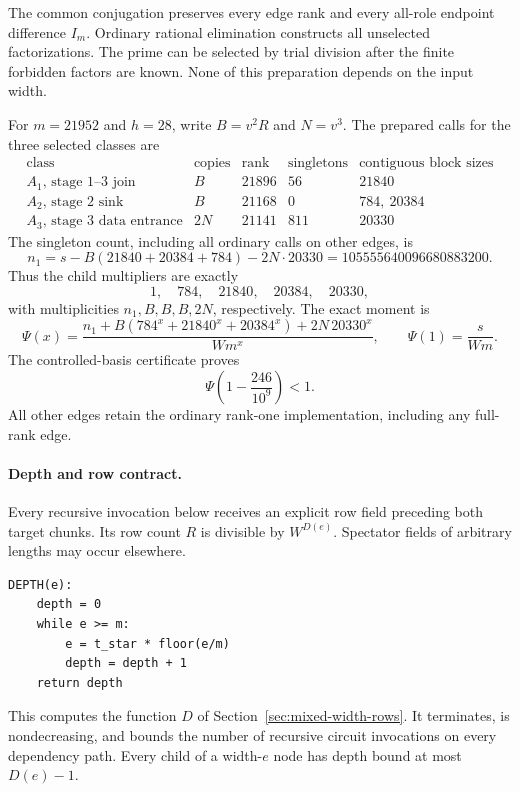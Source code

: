The common conjugation preserves every edge rank and every all-role
endpoint difference $I_m$.  Ordinary rational elimination constructs
all unselected factorizations.  The prime can be selected by trial
division after the finite forbidden factors are known.  None of this
preparation depends on the input width.

For $m=21952$ and $h=28$, write $B=v^2R$ and $N=v^3$.
The prepared calls for the three selected classes are
\[
\begin{array}{c|c|r|r|l}
 \text{class}&\text{copies}&\text{rank}&\text{singletons}&
                   \text{contiguous block sizes}\\ \hline
 A_1\text{, stage 1--3 join}&B&21896&56&21840\\
 A_2\text{, stage 2 sink}&B&21168&0&784,\ 20384\\
 A_3\text{, stage 3 data entrance}&2N&21141&811&20330
\end{array}
\]
The singleton count, including all ordinary calls on other edges, is
\[
 n_1=s-B(21840+20384+784)-2N\cdot20330
     =105555640096680883200.
\]
Thus the child multipliers are exactly
\[
 1,\quad 784,\quad 21840,\quad 20384,\quad 20330,
\]
with multiplicities $n_1,B,B,B,2N$, respectively.  The exact moment is
\[
 \Psi(x)=\frac{n_1+B(784^x+21840^x+20384^x)+2N\,20330^x}{Wm^x},
 \qquad \Psi(1)=\frac{s}{Wm}.
\]
The controlled-basis certificate proves
\[
 \Psi\!\left(1-\frac{246}{10^9}\right)<1.
\]
All other edges retain the ordinary rank-one implementation, including
any full-rank edge.

\paragraph{Depth and row contract.}
Every recursive invocation below receives an explicit row field preceding
both target chunks.  Its row count $R$ is divisible by $W^{D(e)}$.
Spectator fields of arbitrary lengths may occur elsewhere.

\begin{verbatim}
DEPTH(e):
    depth = 0
    while e >= m:
        e = t_star * floor(e/m)
        depth = depth + 1
    return depth
\end{verbatim}

This computes the function $D$ of Section~\ref{sec:mixed-width-rows}.
It terminates, is nondecreasing, and bounds the number of recursive
circuit invocations on every dependency path.  Every child of a width-$e$
node has depth bound at most $D(e)-1$.

